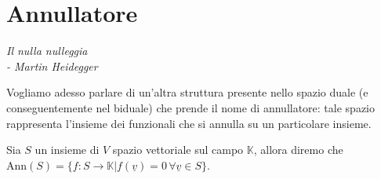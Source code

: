 \section{Annullatore}

\begin{flushright}
    \begin{minipage}{0.25\textwidth}
        \itshape\small
        \noindent Il nulla nulleggia \\
        \noindent - Martin Heidegger
    \end{minipage}
\end{flushright}

Vogliamo adesso parlare di un'altra struttura presente nello spazio duale (e conseguentemente nel biduale) che prende il nome di annullatore: tale spazio rappresenta l'insieme dei funzionali che si annulla su un particolare insieme.
\begin{definition}
    Sia $S$ un insieme di $V$ spazio vettoriale sul campo $\mathbb{K}$, allora diremo che $\text{Ann}(S) = \{ f: S \to \mathbb{K} | f(\underline{v}) = 0 \, \forall \underline{v} \in S \}$.
\end{definition}

